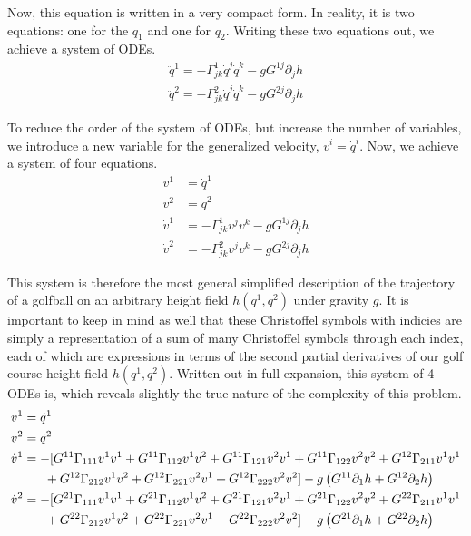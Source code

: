 \vspace{1em}

Now, this equation is written in a very compact form. In reality, it is two equations: one for the $q_1$ and one for $q_2$. Writing these two equations out, we achieve a system of ODEs.
\begin{align}
	\ddot{q}^1  =  -\Gamma^1_{jk} \dot{q}^j \dot{q}^k-g G^{1j} \partial_j h \\
	\ddot{q}^2  =  -\Gamma^2_{jk} \dot{q}^j \dot{q}^k-g G^{2j} \partial_j h
\end{align}

To reduce the order of the system of ODEs, but increase the number of variables, we introduce a new variable for the generalized velocity, $v^i=\dot q^i$. Now, we achieve a system of four equations.
\begin{align}
	v^1 &= \dot q^1\\
	v^2 &= \dot q^2\\
	\dot{v}^1  &=  -\Gamma^1_{jk} v^j v^k-g G^{1j} \partial_j h \\
	\dot{v}^2  &=  -\Gamma^2_{jk} v^j v^k-g G^{2j} \partial_j h
\end{align}

This system is therefore the most general simplified description of the trajectory of a golfball on an arbitrary height field $h(q^1,q^2)$ under gravity $g$. It is important to keep in mind as well that these Christoffel symbols with indicies are simply a representation of a sum of many Christoffel symbols through each index, each of which are expressions in terms of the second partial derivatives of our golf course height field $h(q^1,q^2)$. Written out in full expansion, this system of 4 ODEs is, which reveals slightly the true nature of the complexity of this problem.
\begin{align}
\hspace*{-2em}
v^1 &= \dot{q}^1 \\
v^2 &= \dot{q}^2 \\
\dot{v}^1 &= -[
	G^{11} \Gamma_{111} v^1 v^1
	+ G^{11} \Gamma_{112} v^1 v^2
	+ G^{11} \Gamma_{121} v^2 v^1
	+ G^{11} \Gamma_{122} v^2 v^2
	+ G^{12} \Gamma_{211} v^1 v^1\\
	&~~~~~+ G^{12} \Gamma_{212} v^1 v^2
	+ G^{12} \Gamma_{221} v^2 v^1
	+ G^{12} \Gamma_{222} v^2 v^2
] - g \left( G^{11} \partial_1 h + G^{12} \partial_2 h \right)\nonumber \\
\dot{v}^2 &= -[
	G^{21} \Gamma_{111} v^1 v^1
	+ G^{21} \Gamma_{112} v^1 v^2
	+ G^{21} \Gamma_{121} v^2 v^1
	+ G^{21} \Gamma_{122} v^2 v^2
	+ G^{22} \Gamma_{211} v^1 v^1\\
	&~~~~~+ G^{22} \Gamma_{212} v^1 v^2
	+ G^{22} \Gamma_{221} v^2 v^1
	+ G^{22} \Gamma_{222} v^2 v^2
] - g \left( G^{21} \partial_1 h + G^{22} \partial_2 h \right)\nonumber
\end{align}

